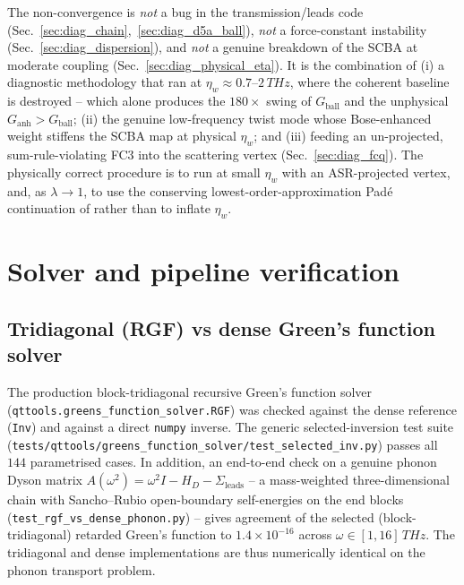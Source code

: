 The non-convergence is \emph{not} a bug in the transmission/leads code
(Sec.~\ref{sec:diag_chain},~\ref{sec:diag_d5a_ball}), \emph{not} a force-constant instability
(Sec.~\ref{sec:diag_dispersion}), and \emph{not} a genuine breakdown of the SCBA at moderate
coupling (Sec.~\ref{sec:diag_physical_eta}). It is the combination of (i) a diagnostic
methodology that ran at $\eta_w\approx0.7$--$2\,THz$, where the coherent baseline is
destroyed -- which alone produces the $180\times$ swing of $G_\text{ball}$ and the
unphysical $G_\text{anh}>G_\text{ball}$; (ii) the genuine low-frequency twist mode whose
Bose-enhanced weight stiffens the SCBA map at physical $\eta_w$; and (iii) feeding an
un-projected, sum-rule-violating FC3 into the scattering vertex
(Sec.~\ref{sec:diag_fcq}). The physically correct procedure is to run at small $\eta_w$ with
an ASR-projected vertex, and, as $\lambda\!\to\!1$, to use the conserving
lowest-order-approximation Pad\'e continuation of
\citet{bescond_LOA_pade_2011, lee_anharmonic_2018} rather than to inflate $\eta_w$.

\section{Solver and pipeline verification}
\label{sec:diag_verify}

\subsection{Tridiagonal (RGF) vs dense Green's function solver}
\label{sec:diag_rgf}

The production block-tridiagonal recursive Green's function solver
(\texttt{qttools.greens\_function\_solver.RGF}) was checked against the dense
reference (\texttt{Inv}) and against a direct \texttt{numpy} inverse. The generic
selected-inversion test suite
(\texttt{tests/qttools/greens\_function\_solver/test\_selected\_inv.py}) passes all
$144$ parametrised cases. In addition, an end-to-end check on a genuine phonon
Dyson matrix $A(\omega^2)=\omega^2 I - H_D - \Sigma_\text{leads}$ -- a mass-weighted
three-dimensional chain with Sancho--Rubio open-boundary self-energies on the end
blocks (\texttt{test\_rgf\_vs\_dense\_phonon.py}) -- gives agreement of the selected
(block-tridiagonal) retarded Green's function to $1.4\times10^{-16}$ across
$\omega\in[1,16]\,THz$. The tridiagonal and dense implementations are thus
numerically identical on the phonon transport problem.

